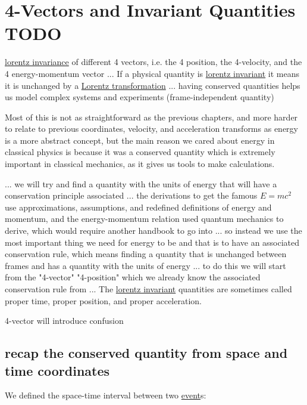 \chapter{4-Vectors and Invariant Quantities TODO}

\hyperlink{def-lorentz-invariant}{lorentz invariance} of different 4 vectors, i.e. the 4 position, the 4-velocity, and the 4 energy-momentum vector
... If a physical quantity is \hyperlink{def-lorentz-invariant}{lorentz invariant} it means it is unchanged by a \hyperlink{def-lorentz-transform}{Lorentz transformation}
... having conserved quantities helps us model complex systems and experiments (frame-independent quantity)

Most of this is not as straightforward as the previous chapters, and more harder to relate to previous coordinates, velocity, and acceleration transforms as energy is a more abstract concept, but the main reason we cared about energy in classical physics is because it was a conserved quantity which is extremely important in classical mechanics, as it gives us tools to make calculations.

... we will try and find a quantity with the units of energy that will have a conservation principle associated
... the derivations to get the famous $E=mc^2$ use approximations, assumptions, and redefined definitions of energy and momentum, and the energy-momentum relation used quantum mechanics to derive, which would require another handbook to go into
... so instead we use the most important thing we need for energy to be and that is to have an associated conservation rule, which means finding a quantity that is unchanged between frames and has a quantity with the units of energy
... to do this we will start from the "4-vector" "4-position" which we already know the associated conservation rule from
... The \hyperlink{def-lorentz-invariant}{lorentz invariant} quantities are sometimes called proper time, proper position, and proper acceleration.

4-vector will introduce confusion

\section{recap the conserved quantity from space and time coordinates}

We defined the space-time interval between two \hyperlink{def-event}{event}s:

